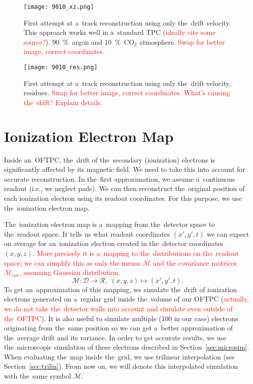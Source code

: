 		\begin{figure}[H]
			\centering
			\texttt{[image: 9010\_xz.png]}
			\caption{First attempt at a~track reconstruction using only the~drift velocity. This approach works well in a~standard \ac{TPC} (\textcolor{red}{ideally cite some source?}). 90~\%~argon and 10~\%~CO$_2$ atmosphere. \textcolor{red}{Swap for better image, correct coordinates.}}
			\label{fig:9010xz}
		\end{figure}
		
		\begin{figure}[H]
			\centering
			\texttt{[image: 9010\_res.png]}
			\caption{First attempt at a~track reconstruction using only the~drift velocity, residues. \textcolor{red}{Swap for better image, correct coordinates. What's causing the~shift? Explain details.}}
			\label{fig:9010res}
		\end{figure}
	
	\section{Ionization Electron Map}
	\label{sec:map}
		Inside an~\ac{OFTPC}, the~drift of the~secondary (ionization) electrons is significantly affected by its magnetic field. We need to take this into account for accurate reconstruction. In the~first approximation, we assume a~continuous readout (i.e., we neglect pads). We can then reconstruct the~original position of each ionization electron using its readout coordinates. For this purpose, we use the~ionization electron map.
		
		The~ionization electron map is a~mapping from the~detector space to the~readout space. It tells us what readout coordinates $(x',y',t)$ we can expect on average for an~ionization electron created in the~detector coordinates $(x,y,z)$. \textcolor{red}{More precisely it is a~mapping to the~distributions on the~readout space; we can simplify this as only the means $\overbar{\mathcal{M}}$ and the covariance matrices $\mathcal{M}_\text{cov}$, assuming Gaussian distribution.}
			\begin{equation}
				\mathcal{M}: \mathcal{D} \longrightarrow \mathcal{R},\; (x,y,z) \longmapsto (x',y',t).
			\end{equation}
		To get an~approximation of this mapping, we simulate the~drift of ionization electrons generated on a~regular grid inside the~volume of our \ac{OFTPC} (\textcolor{red}{actually, we do not take the~detector walls into account and simulate even outside of the~\ac{OFTPC}}). It is also useful to simulate multiple (100 in our case) electrons originating from the~same position so we can get a~better approximation of the~average drift and its variance. In order to get accurate results, we use the~microscopic simulation of these electrons described in Section~\ref{sec:microsim}. When evaluating the~map inside the~grid, we use trilinear interpolation (see Section~\ref{sec:trilin}). From now on, we will denote this interpolated simulation with the~same symbol $\mathcal{M}$.
		
